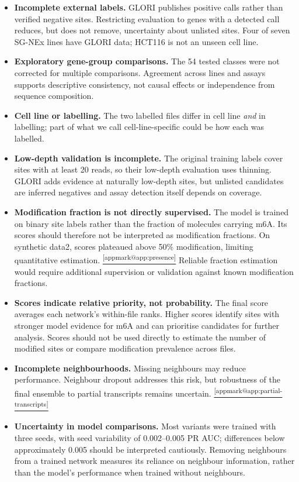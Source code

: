 \documentclass[11pt,a4paper]{article}
\makeatletter
\DeclareRobustCommand{\applink}[1]{%
    \hyperref[#1]{\textsuperscript{\ref*{appmark@#1}}}}
\makeatother
\begin{document}
\begin{itemize}
    \item \textbf{Incomplete external labels.} GLORI publishes positive
    calls rather than verified negative sites. Restricting evaluation to
    genes with a detected call reduces, but does not remove, uncertainty
    about unlisted sites. Four of seven SG-NEx lines have GLORI data;
    HCT116 is not an unseen cell line.
    \item \textbf{Exploratory gene-group comparisons.} The 54 tested
    classes were not corrected for multiple comparisons. Agreement across
    lines and assays supports descriptive consistency, not causal effects
    or independence from sequence composition.

    \item \textbf{Cell line or labelling.} The two labelled files differ in
    cell line \emph{and} in labelling; part of what we call cell-line-specific
    could be how each was labelled.
    \item \textbf{Low-depth validation is incomplete.} The original
    training labels cover sites with at least 20 reads, so their low-depth
    evaluation uses thinning. GLORI adds evidence at naturally low-depth
    sites, but unlisted candidates are inferred negatives and assay detection
    itself depends on coverage.
    \item \textbf{Modification fraction is not directly supervised.}
    The model is trained on binary site labels rather than the
    fraction of molecules carrying m6A. Its scores should therefore
    not be interpreted as modification fractions. On synthetic
    data2, scores plateaued above 50\% modification, limiting
    quantitative estimation.\applink{app:presence} Reliable
    fraction estimation would require additional supervision
    or validation against known modification fractions.
    \item \textbf{Scores indicate relative priority, not probability.}
    The final score averages each network's within-file ranks.
    Higher scores identify sites with stronger model evidence
    for m6A and can prioritise candidates for further analysis.
    Scores should not be used directly to estimate the number
    of modified sites or compare modification prevalence
    across files.
    \item \textbf{Incomplete neighbourhoods.}
    Missing neighbours may reduce performance. Neighbour dropout addresses
    this risk, but robustness of the final ensemble to partial transcripts
    remains uncertain.\applink{app:partial-transcripts}
    \item \textbf{Uncertainty in model comparisons.}
    Most variants were trained with three seeds, with seed
    variability of 0.002--0.005 PR AUC; differences below
    approximately 0.005 should be interpreted cautiously.
    Removing neighbours from a trained network measures its
    reliance on neighbour information, rather than the model's performance when trained without neighbours.
\end{itemize}
\end{document}
